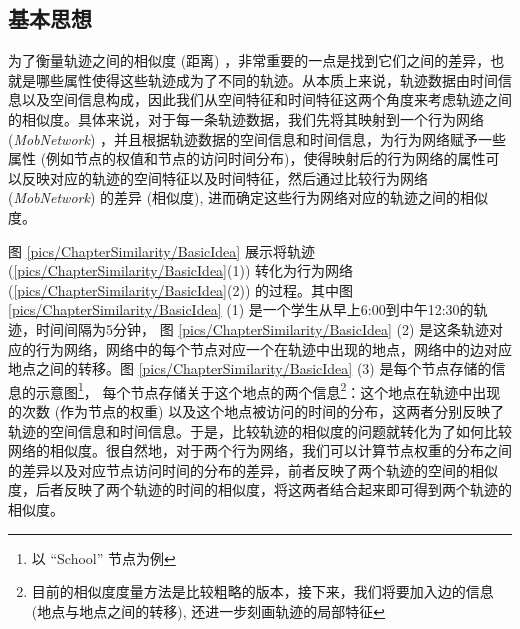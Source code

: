 \subsection{基本思想}
为了衡量轨迹之间的相似度 (距离) ，非常重要的一点是找到它们之间的差异，也就是哪些属性使得这些轨迹成为了不同的轨迹。从本质上来说，轨迹数据由时间信息以及空间信息构成，因此我们从空间特征和时间特征这两个角度来考虑轨迹之间的相似度。具体来说，对于每一条轨迹数据，我们先将其映射到一个行为网络 (\emph{MobNetwork}) ，并且根据轨迹数据的空间信息和时间信息，为行为网络赋予一些属性 (例如节点的权值和节点的访问时间分布)，使得映射后的行为网络的属性可以反映对应的轨迹的空间特征以及时间特征，然后通过比较行为网络 (\emph{MobNetwork}) 的差异 (相似度), 进而确定这些行为网络对应的轨迹之间的相似度。\par
\vspace{2mm}

图 \ref{pics/ChapterSimilarity/BasicIdea} 展示将轨迹 (\ref{pics/ChapterSimilarity/BasicIdea}(1)) 转化为行为网络 (\ref{pics/ChapterSimilarity/BasicIdea}(2)) 的过程。其中图 \ref{pics/ChapterSimilarity/BasicIdea} (1) 是一个学生从早上6:00到中午12:30的轨迹，时间间隔为5分钟， 图 \ref{pics/ChapterSimilarity/BasicIdea} (2) 是这条轨迹对应的行为网络，网络中的每个节点对应一个在轨迹中出现的地点，网络中的边对应地点之间的转移。图 \ref{pics/ChapterSimilarity/BasicIdea} (3) 是每个节点存储的信息的示意图\footnote{以 ``School'' 节点为例}， 每个节点存储关于这个地点的两个信息\footnote{目前的相似度度量方法是比较粗略的版本，接下来，我们将要加入边的信息 (地点与地点之间的转移), 还进一步刻画轨迹的局部特征}：这个地点在轨迹中出现的次数 (作为节点的权重) 以及这个地点被访问的时间的分布，这两者分别反映了轨迹的空间信息和时间信息。于是，比较轨迹的相似度的问题就转化为了如何比较网络的相似度。很自然地，对于两个行为网络，我们可以计算节点权重的分布之间的差异以及对应节点访问时间的分布的差异，前者反映了两个轨迹的空间的相似度，后者反映了两个轨迹的时间的相似度，将这两者结合起来即可得到两个轨迹的相似度。\par

